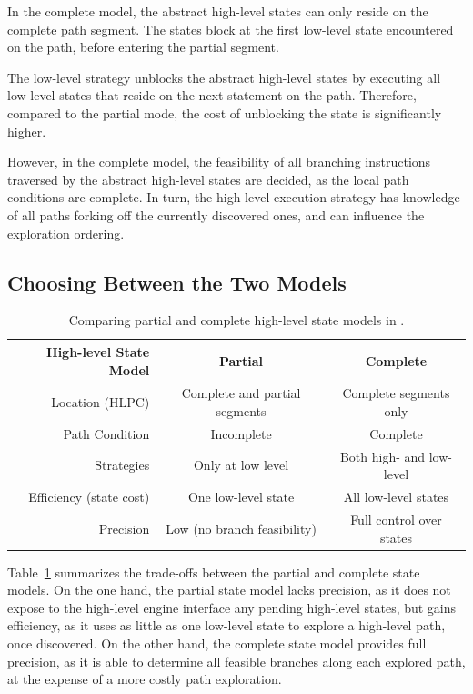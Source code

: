 In the complete model, the abstract high-level states can only reside on the complete path segment.
%
The states block at the first low-level state encountered on the path, before entering the partial segment.

The low-level strategy unblocks the abstract high-level states by executing all low-level states that reside on the next statement on the path.
%
Therefore, compared to the partial mode, the cost of unblocking the state is significantly higher.

However, in the complete model, the feasibility of all branching instructions traversed by the abstract high-level states are decided, as the local path conditions are complete.
%
In turn, the high-level execution strategy has knowledge of all paths forking off the currently discovered ones, and can influence the exploration ordering.

\subsection{Choosing Between the Two Models}

\newcommand{\goodcolor}{\cellcolor{LimeGreen}}
\newcommand{\badcolor}{\cellcolor{Lavender}}

\begin{table}
  \centering
  \small
  \begin{tabular}{r c c}
    High-level State Model & \textbf{Partial} & \textbf{Complete}               \\
    \hline
    \noalign{\smallskip}
    Location (HLPC) & Complete and partial segments & Complete segments only    \\
    Path Condition  & Incomplete                    & Complete                  \\
    Strategies      & Only at low level             & Both high- and low-level  \\
    \noalign{\smallskip}
    \hline
    \noalign{\smallskip}
    Efficiency (state cost) & \goodcolor One low-level state   & \badcolor All low-level states      \\
    Precision       & \badcolor Low (no branch feasibility)   & \goodcolor Full control over states  \\
  \end{tabular}
  \caption{Comparing partial and complete high-level state models in \chef.}
  \label{tab:chef:hl-states}
\end{table}

Table~\ref{tab:chef:hl-states} summarizes the trade-offs between the partial and complete state models.
%
On the one hand, the partial state model lacks precision, as it does not expose to the high-level engine interface any pending high-level states, but gains efficiency, as it uses as little as one low-level state to explore a high-level path, once discovered.
%
On the other hand, the complete state model provides full precision, as it is able to determine all feasible branches along each explored path, at the expense of a more costly path exploration.

